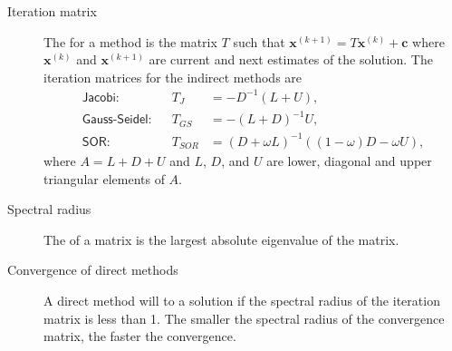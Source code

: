 \documentclass[letterpaper,10pt,english]{jupyterBook}
\begin{document}
\begin{description}
\item[{Iteration matrix\label{\detokenize{8_Appendices/8.0_Cheat_sheet:term-Iteration-matrix}}}] \leavevmode
\sphinxAtStartPar
The {\hyperref[\detokenize{7_Indirect_methods/7.0_Indirect_methods:indirect-methods-chapter}]{}} for a method is the matrix \(T\) such that \(\mathbf{x}^{(k+1)} = T\mathbf{x}^{(k)} + \mathbf{c}\) where \(\mathbf{x}^{(k)}\) and \(\mathbf{x}^{(k+1)}\) are current and next estimates of the solution. The iteration matrices for the indirect methods are
\begin{align*}
    \textsf{Jacobi}: && T_J &= - D^{-1}(L + U),\\
    \textsf{Gauss-Seidel}: && T_{GS} &=-(L+D)^{-1} U, \\
    \textsf{SOR}: && T_{SOR} &=(D+\omega L)^{-1} ((1-\omega )D-\omega U),
\end{align*}
\sphinxAtStartPar
where \(A = L + D + U\) and \(L\), \(D\), and \(U\) are lower, diagonal and upper triangular elements of \(A\).

\item[{Spectral radius\label{\detokenize{8_Appendices/8.0_Cheat_sheet:term-Spectral-radius}}}] \leavevmode
\sphinxAtStartPar
The {\hyperref[\detokenize{7_Indirect_methods/7.3_Convergence_of_indirect_methods:spectral-radius-definition}]{}} of a matrix is the largest absolute eigenvalue of the matrix.

\item[{Convergence of direct methods\label{\detokenize{8_Appendices/8.0_Cheat_sheet:term-Convergence-of-direct-methods}}}] \leavevmode
\sphinxAtStartPar
A direct method will {\hyperref[\detokenize{7_Indirect_methods/7.3_Convergence_of_indirect_methods:convergence-of-indirect-methods-section}]{}} to a solution if the spectral radius of the iteration matrix is less than 1. The smaller the spectral radius of the convergence matrix, the faster the convergence.


\end{description}
\end{document}
